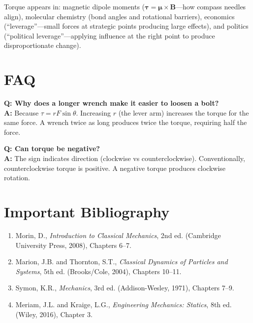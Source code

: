 Torque appears in: magnetic dipole moments ($\boldsymbol{\tau} = \boldsymbol{\mu} \times \mathbf{B}$---how compass needles align), molecular chemistry (bond angles and rotational barriers), economics (``leverage''---small forces at strategic points producing large effects), and politics (``political leverage''---applying influence at the right point to produce disproportionate change).
\section*{FAQ}

\textbf{Q: Why does a longer wrench make it easier to loosen a bolt?}\\
\textbf{A:} Because $\tau = rF\sin\theta$. Increasing $r$ (the lever arm) increases the torque for the same force. A wrench twice as long produces twice the torque, requiring half the force.

\textbf{Q: Can torque be negative?}\\
\textbf{A:} The sign indicates direction (clockwise vs counterclockwise). Conventionally, counterclockwise torque is positive. A negative torque produces clockwise rotation.
\section*{Important Bibliography}

\begin{enumerate}
\item Morin, D., \textit{Introduction to Classical Mechanics}, 2nd ed. (Cambridge University Press, 2008), Chapters 6--7.
\item Marion, J.B. and Thornton, S.T., \textit{Classical Dynamics of Particles and Systems}, 5th ed. (Brooks/Cole, 2004), Chapters 10--11.
\item Symon, K.R., \textit{Mechanics}, 3rd ed. (Addison-Wesley, 1971), Chapters 7--9.
\item Meriam, J.L. and Kraige, L.G., \textit{Engineering Mechanics: Statics}, 8th ed. (Wiley, 2016), Chapter 3.
\end{enumerate}

